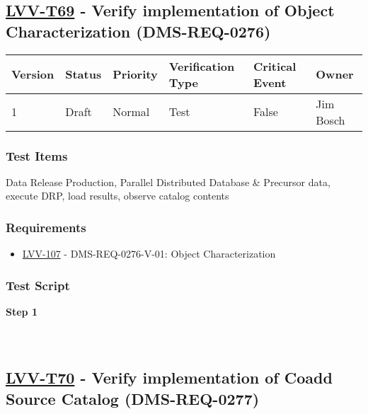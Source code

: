 \hypertarget{lvv-t69---verify-implementation-of-object-characterization-dms-req-0276}{%
\subsection{\texorpdfstring{\href{https://jira.lsstcorp.org/secure/Tests.jspa\#/testCase/LVV-T69}{LVV-T69}
- Verify implementation of Object Characterization
(DMS-REQ-0276)}{LVV-T69 - Verify implementation of Object Characterization (DMS-REQ-0276)}}\label{lvv-t69---verify-implementation-of-object-characterization-dms-req-0276}}

\begin{longtable}[]{@{}llllll@{}}
\toprule
Version & Status & Priority & Verification Type & Critical Event &
Owner\tabularnewline
\midrule
\endhead
1 & Draft & Normal & Test & False & Jim Bosch\tabularnewline
\bottomrule
\end{longtable}

\hypertarget{test-items-158}{%
\subsubsection{Test Items}\label{test-items-158}}

Data Release Production, Parallel Distributed Database \& Precursor
data, execute DRP, load results, observe catalog contents

\hypertarget{requirements-159}{%
\subsubsection{Requirements}\label{requirements-159}}

\begin{itemize}
\tightlist
\item
  \href{https://jira.lsstcorp.org/browse/LVV-107}{LVV-107} -
  DMS-REQ-0276-V-01: Object Characterization
\end{itemize}

\hypertarget{test-script-159}{%
\subsubsection{Test Script}\label{test-script-159}}

\textbf{Step 1}\\
~\\
~\\

\hypertarget{lvv-t70---verify-implementation-of-coadd-source-catalog-dms-req-0277}{%
\subsection{\texorpdfstring{\href{https://jira.lsstcorp.org/secure/Tests.jspa\#/testCase/LVV-T70}{LVV-T70}
- Verify implementation of Coadd Source Catalog
(DMS-REQ-0277)}{LVV-T70 - Verify implementation of Coadd Source Catalog (DMS-REQ-0277)}}\label{lvv-t70---verify-implementation-of-coadd-source-catalog-dms-req-0277}}

